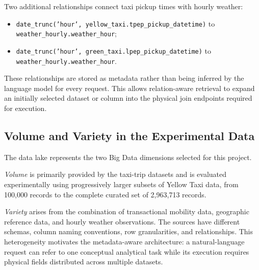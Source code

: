 Two additional relationships connect taxi pickup times with hourly weather:

\begin{itemize}

    \item
    \texttt{date\_trunc('hour',
    yellow\_taxi.tpep\_pickup\_datetime)}
    to \texttt{weather\_hourly.weather\_hour};

    \item
    \texttt{date\_trunc('hour',
    green\_taxi.lpep\_pickup\_datetime)}
    to \texttt{weather\_hourly.weather\_hour}.

\end{itemize}

These relationships are stored as metadata rather than being inferred by the
language model for every request. This allows relation-aware retrieval to
expand an initially selected dataset or column into the physical join
endpoints required for execution.


\subsection{Volume and Variety in the Experimental Data}

The data lake represents the two Big Data dimensions selected for this
project.

\emph{Volume} is primarily provided by the taxi-trip datasets and is evaluated
experimentally using progressively larger subsets of Yellow Taxi data, from
100,000 records to the complete curated set of 2,963,713 records.

\emph{Variety} arises from the combination of transactional mobility data,
geographic reference data, and hourly weather observations. The sources have
different schemas, column naming conventions, row granularities, and
relationships. This heterogeneity motivates the metadata-aware architecture:
a natural-language request can refer to one conceptual analytical task while
its execution requires physical fields distributed across multiple datasets.
